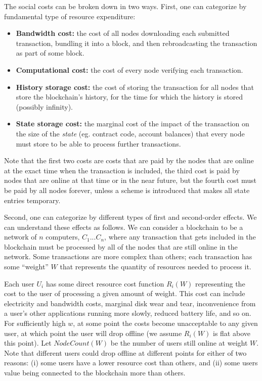 \documentclass[12pt, final]{article}
\begin{document}
The social costs can be broken down in two ways. First, one can categorize by fundamental type of resource expenditure:

\begin{itemize}
\item[] \textbf{Bandwidth cost:} the cost of all nodes downloading each submitted transaction, bundling it into a block, and then rebroadcasting the transaction as part of some block.

\item[] \textbf{Computational cost:} the cost of every node verifying each transaction.

\item[] \textbf{History storage cost:} the cost of storing the transaction for all nodes that store the blockchain's history, for the time for which the history is stored (possibly infinity).

\item[] \textbf{State storage cost:} the marginal cost of the impact of the transaction on the size of the \emph{state} (eg. contract code, account balances) that every node must store to be able to process further transactions.
\end{itemize}

Note that the first two costs are costs that are paid by the nodes that are online at the exact time when the transaction is included, the third cost is paid by nodes that are online at that time or in the near future, but the fourth cost must be paid by all nodes forever, unless a scheme is introduced that makes all state entries temporary.

Second, one can categorize by different types of first and second-order effects. We can understand these effects as follows. We can consider a blockchain to be a network of $n$ computers, $C_1 ... C_n$, where any transaction that gets included in the blockchain must be processed by all of the nodes that are still online in the network. Some transactions are more complex than others; each transaction has some ``weight'' $W$ that represents the quantity of resources needed to process it.

Each user $U_i$ has some direct resource cost function $R_i(W)$ representing the cost to the user of processing a given amount of weight. This cost can include electricity and bandwidth costs, marginal disk wear and tear, inconvenience from a user's other applications running more slowly, reduced battery life, and so on. For sufficiently high $w$, at some point the costs become unacceptable to any given user, at which point the user will drop offline (we assume $R_i(W)$ is flat above this point). Let $NodeCount(W)$ be the number of users still online at weight $W$. Note that different users could drop offline at different points for either of two reasons: (i) some users have a lower resource cost than others, and (ii) some users value being connected to the blockchain more than others.
\end{document}
